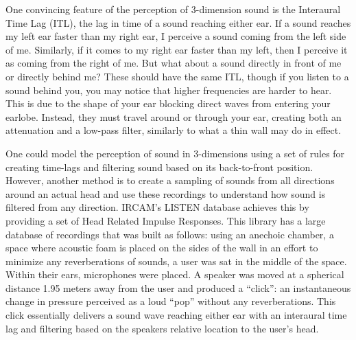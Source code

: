 One convincing feature of the perception of 3-dimension sound is the Interaural Time Lag (ITL), the lag in time of a sound reaching either ear.  If a sound reaches my left ear faster than my right ear, I perceive a sound coming from the left side of me.  Similarly, if it comes to my right ear faster than my left, then I perceive it as coming from the right of me.  But what about a sound directly in front of me or directly behind me?  These should have the same ITL, though if you listen to a sound behind you, you may notice that higher frequencies are harder to hear.  This is due to the shape of your ear blocking direct waves from entering your earlobe.  Instead, they must travel around or through your ear, creating both an attenuation and a low-pass filter, similarly to what a thin wall may do in effect.  

One could model the perception of sound in 3-dimensions using a set of rules for creating time-lags and filtering sound based on its back-to-front position.  However, another method is to create a sampling of sounds from all directions around an actual head and use these recordings to understand how sound is filtered from any direction.  IRCAM's LISTEN database achieves this by providing a set of Head Related Impulse Responses.  This library has a large database of recordings that was built as follows: using an anechoic chamber, a space where acoustic foam is placed on the sides of the wall in an effort to minimize any reverberations of sounds, a user was sat in the middle of the space.  Within their ears, microphones were placed.  A speaker was moved at a spherical distance 1.95 meters away from the user and produced a ``click'': an instantaneous change in pressure perceived as a loud ``pop'' without any reverberations.  This click essentially delivers a sound wave reaching either ear with an interaural time lag and filtering based on the speakers relative location to the user's head.  

